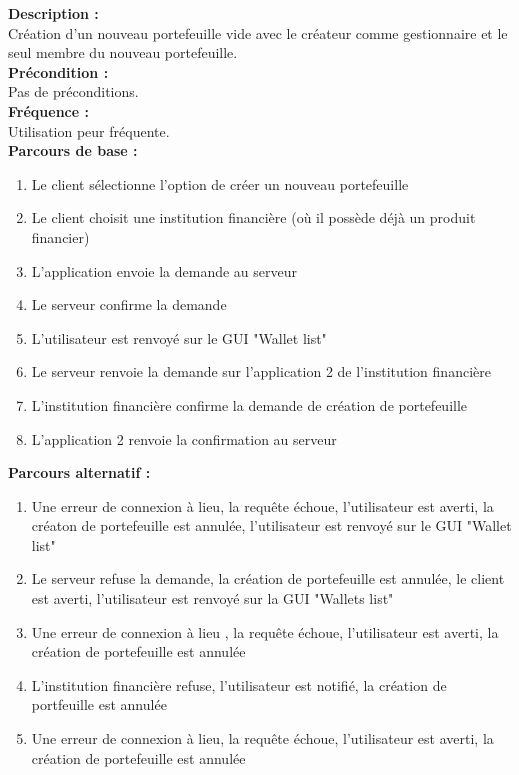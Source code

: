 \documentclass[../rapport.tex]{subfiles}
\begin{document}
\textbf{Description :} \\
Création d'un nouveau portefeuille vide avec le créateur comme gestionnaire et le seul membre du nouveau portefeuille. \\

\textbf{Précondition :} \\
Pas de préconditions. \\

\textbf{Fréquence :} \\
Utilisation peur fréquente. \\

\textbf{Parcours de base :} \\
\begin{enumerate}
    \item Le client sélectionne l'option de créer un nouveau portefeuille
    \item Le client choisit une institution financière (où il possède déjà un produit financier)
    \item L'application envoie la demande au serveur
    \item Le serveur confirme la demande
    \item L'utilisateur est renvoyé sur le GUI "Wallet list"
    \item Le serveur renvoie la demande sur l'application 2 de l'institution financière
    \item L'institution financière confirme la demande de création de portefeuille
    \item L'application 2 renvoie la confirmation au serveur
\end{enumerate}
\bigskip

\textbf{Parcours alternatif :}
\begin{enumerate}
    \item Une erreur de connexion à lieu, la requête échoue, l'utilisateur est averti, la créaton de portefeuille est annulée, l'utilisateur est renvoyé sur le GUI "Wallet list"
    \item Le serveur refuse la demande, la création de portefeuille est annulée, le client est averti, l’utilisateur est renvoyé sur la GUI "Wallets list"
    \item Une erreur de connexion à lieu , la requête échoue, l’utilisateur est averti, la création de portefeuille est annulée
    \item L’institution financière refuse, l’utilisateur est notifié, la création de portfeuille est annulée
    \item Une erreur de connexion à lieu, la requête échoue, l’utilisateur est averti, la création de portefeuille est annulée
\end{enumerate}
\end{document}
